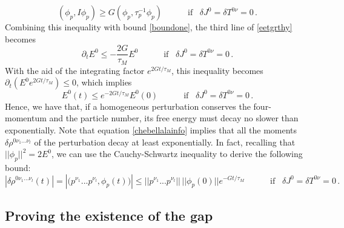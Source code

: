 \documentclass[a4paper, amsfonts, amssymb, amsmath, reprint, showkeys, nofootinbib, twoside, onecolumn,notitlepage]{revtex4-2}
\newcommand{\spc}{\quad \quad \quad}
\theoremstyle{definition}
\theoremstyle{theorem}
\theoremstyle{corollary}
\begin{document}
\begin{equation}\label{coercitiy}
    (\phi_p,I\phi_p) \geq G (\phi_p,\tau_p^{-1}\phi_p) \spc \text{if } \, \, \, \delta J^0=\delta T^{0\nu}=0 \, .
\end{equation}
Combining this inequality with bound \eqref{boundone}, the third line of \eqref{eetgrthy} becomes
\begin{equation}
\partial_t E^0 \leq -\dfrac{2G}{\tau_M} E^0 \spc \text{if } \, \, \, \delta J^0=\delta T^{0\nu}=0 \, .
\end{equation}
With the aid of the integrating factor $e^{2Gt/\tau_M}$, this inequality becomes $\partial_t(E^0e^{2Gt/\tau_M})\leq 0$, which implies
\begin{equation}\label{chebellalainfo}
    E^0(t) \leq e^{-2Gt/\tau_M}E^0(0) \spc \text{if } \, \, \, \delta J^0=\delta T^{0\nu}=0 \, .
\end{equation}
Hence, we have that, if a homogeneous perturbation conserves the four-momentum and the particle number, its free energy must decay no slower than exponentially. Note that equation \eqref{chebellalainfo} implies that all the moments $\delta \rho^{0\nu_1 ... \nu_l}$ of the perturbation decay at least exponentially. In fact, recalling that $||\phi_p||^2=2E^0$, we can use the Cauchy-Schwartz inequality to derive the following bound:
\begin{equation}
|\delta \rho^{0\nu_1 ... \nu_l}(t)|=|\big(p^{\nu_1}...p^{\nu_l},\phi_p(t)\big)| \leq || p^{\nu_1}...p^{\nu_l} || \, || \phi_p(0) ||e^{-Gt/\tau_M} \spc \text{if } \, \, \, \delta J^0=\delta T^{0\nu}=0 \, .
\end{equation}

\subsection{Proving the existence of the gap}
\end{document}
